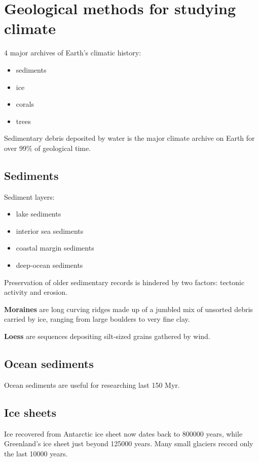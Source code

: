 \section{Geological methods for studying climate}

4 major archives of Earth's climatic history:
\begin{itemize}
	\item sediments
	\item ice
	\item corals
	\item trees
\end{itemize}

Sedimentary debris deposited by water is the major climate archive on Earth
for over 99\% of geological time.

\subsection{Sediments}
Sediment layers:

\begin{itemize}
	\item lake sediments
	\item interior sea sediments
	\item coastal margin sediments
	\item deep-ocean sediments
\end{itemize}

Preservation of older sedimentary records is hindered by two factors:
tectonic activity and erosion.

\textbf{Moraines} are long curving ridges made up of a jumbled mix of unsorted
debris carried by ice, ranging from large boulders to very fine clay.

\textbf{Loess} are sequences depositing silt-sized grains gathered by wind.

\subsection{Ocean sediments}
Ocean sediments are useful for researching last 150 Myr.

\subsection{Ice sheets}
Ice recovered from Antarctic ice sheet now dates back to 800000 years, while
Greenland's ice sheet just beyond 125000 years. Many small glaciers record only
the last 10000 years.

